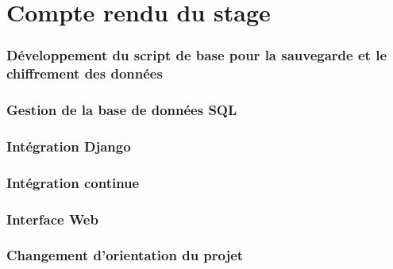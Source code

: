 \part{Compte rendu du stage}

\section{Développement du script de base pour la sauvegarde et le chiffrement des données}



\section{Gestion de la base de données SQL}



\section{Intégration Django}



\section{Intégration continue}



\section{Interface Web}



\section{Changement d'orientation du projet}




